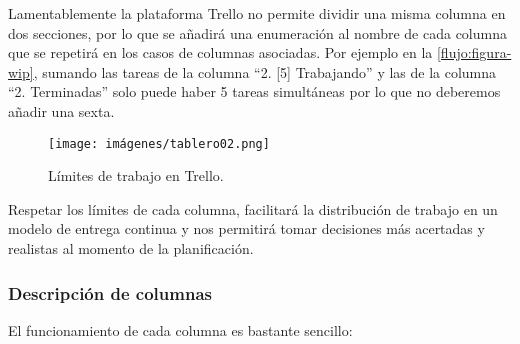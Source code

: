Lamentablemente la plataforma Trello no permite dividir una misma columna en dos secciones, por lo que se añadirá una enumeración al nombre de cada columna que se repetirá en los casos de columnas asociadas. Por ejemplo en la \autoref{flujo:figura-wip}, sumando las tareas de la columna “2. [5] Trabajando” y las de la columna “2. Terminadas” solo puede haber 5 tareas simultáneas por lo que no deberemos añadir una sexta.

\begin{figure}[h]
	\centering
	\caption{Límites de trabajo en Trello.}
	\label{flujo:figura-wip}
	\texttt{[image: imágenes/tablero02.png]}
\end{figure}

Respetar los límites de cada columna, facilitará la distribución de trabajo en un modelo de entrega continua y nos permitirá tomar decisiones más acertadas y realistas al momento de la planificación.

\subsubsection{Descripción de columnas}\label{flujo:descripcion-de-columnas}
El funcionamiento de cada columna es bastante sencillo:

